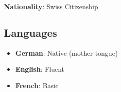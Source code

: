 
\textbf{Nationality}: Swiss Citizenship

\subsection{Languages}
\begin{itemize}
	\item \textbf{German}: Native (mother tongue)
    \item \textbf{English}: Fluent
    \item \textbf{French}: Basic
\end{itemize}

